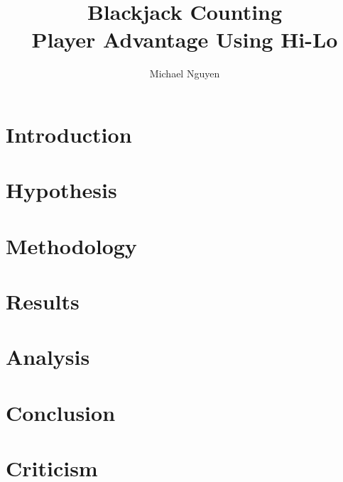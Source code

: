 \documentclass[11pt,letterpaper]{article}
\title{Blackjack Counting
\\\normalsize{Player Advantage Using Hi-Lo}}
\author{Michael Nguyen}
\begin{document}
\maketitle

\part{Introduction}
\part{Hypothesis}
\part{Methodology}
\part{Results}
\part{Analysis}
\part{Conclusion}
\part{Criticism}
\end{document}
